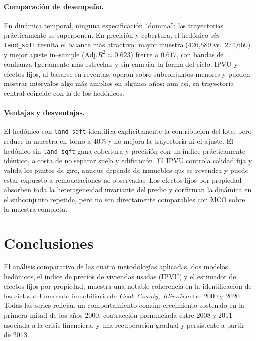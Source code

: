 \documentclass[conference]{IEEEtran}
\begin{document}
\paragraph{Comparación de desempeño.}
En dinámica temporal, ninguna especificación “domina”: las trayectorias prácticamente se superponen. En precisión y cobertura, el hedónico \emph{sin} \texttt{land\_sqft} resulta el balance más atractivo: mayor muestra (426{,}589 vs.\ 274{,}660) y mejor ajuste in–sample (Adj.\(R^2\approx 0.623\)) frente a \(0.617\), con bandas de confianza ligeramente más estrechas y sin cambiar la forma del ciclo. IPVU y efectos fijos, al basarse en reventas, operan sobre subconjuntos menores y pueden mostrar intervalos algo más amplios en algunos años; aun así, su trayectoria central coincide con la de los hedónicos.

\paragraph{Ventajas y desventajas.}
El hedónico con \texttt{land\_sqft} identifica explícitamente la contribución del lote, pero reduce la muestra en torno a 40\% y no mejora la trayectoria ni el ajuste. El hedónico sin \texttt{land\_sqft} gana cobertura y precisión con un índice prácticamente idéntico, a costa de no separar suelo y edificación. El IPVU controla calidad fija y valida los puntos de giro, aunque depende de inmuebles que se revenden y puede estar expuesto a remodelaciones no observadas. Los efectos fijos por propiedad absorben toda la heterogeneidad invariante del predio y confirman la dinámica en el subconjunto repetido, pero no son directamente comparables con MCO sobre la muestra completa.



\section{Conclusiones}

El análisis comparativo de las cuatro metodologías aplicadas, dos modelos hedónicos, el índice de precios de viviendas usadas (IPVU) y el estimador de efectos fijos por propiedad, muestra una notable coherencia en la identificación de los ciclos del mercado inmobiliario de \textit{Cook County, Illinois} entre 2000 y 2020. Todas las series reflejan un comportamiento común: crecimiento sostenido en la primera mitad de los años 2000, contracción pronunciada entre 2008 y 2011 asociada a la crisis financiera, y una recuperación gradual y persistente a partir de 2013.
\end{document}
